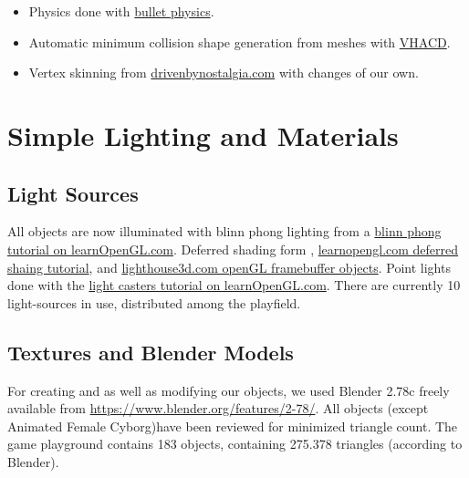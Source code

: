 \documentclass[12pt]{article}
\begin{document}
\begin{itemize}
  \item Physics done with \href{http://bulletphysics.org/wordpress/}{bullet physics}.

  \item Automatic minimum collision shape generation from meshes with \href{https://github.com/kmammou/v-hacd}{VHACD}.

  \item Vertex skinning from \href{http://drivenbynostalgia.com/}{drivenbynostalgia.com} with changes of our own.
\end{itemize}


\section{Simple Lighting and Materials}


\subsection{Light Sources \label{lightSources}}
All objects are now illuminated with blinn phong lighting from a \href{http://learnopengl.com/#!Advanced-Lighting/Advanced-Lighting}{blinn phong tutorial on learnOpenGL.com}. Deferred shading form \cite{openGLSuperBible}, \href{http://learnopengl.com/#!Advanced-Lighting/Deferred-Shading}{learnopengl.com deferred shaing tutorial}, and \href{http://www.lighthouse3d.com/tutorials/opengl_framebuffer_objects/}{lighthouse3d.com openGL framebuffer objects}.
Point lights done with the \href{http://learnopengl.com/#!Lighting/Light-casters}{light casters tutorial on learnOpenGL.com}. There are currently 10 light-sources in use, distributed among the playfield.


\subsection{Textures and Blender Models}

For creating and as well as modifying our objects, we used Blender 2.78c freely available from \url{https://www.blender.org/features/2-78/}. All objects (except Animated Female Cyborg)have been reviewed for minimized triangle count. The game playground contains 183 objects, containing 275.378 triangles (according to Blender).
\end{document}
